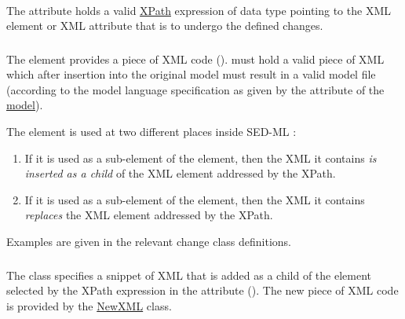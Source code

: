 

\paragraph*{}
\label{sec:changeTarget}
The  attribute holds  a valid \hyperref[sec:xpath]{XPath} expression of data type \hyperref[type:xpath]{} pointing to the XML element or XML attribute that is to undergo the defined changes.


\subsubsection{}
\label{sec:newXml}
The  element provides a piece of XML code ().  must hold a valid piece of XML  which after insertion into the original model must result in a valid model file (according to the model language specification as given by the \hyperref[sec:language]{} attribute of the \hyperref[class:model]{model}).

The  element is used at two different places inside SED-ML \currentLV:

\begin{enumerate}
	\item{If it is used as a sub-element of the \hyperref[class:addXml]{} element, then the XML it contains \emph{is inserted as a child} of the XML element addressed by the XPath.}
	\item{If it is used as a sub-element of the \hyperref[class:changeXml]{} element, then the XML it contains \emph{replaces} the XML element addressed by the XPath.}
\end{enumerate}

Examples are given in the relevant change class definitions.


\subsubsection{}
\label{class:addXml}
The  class specifies a snippet of XML that is added as a child of the element selected by the XPath expression in the \hyperref[sec:changeTarget]{} attribute (). The new piece of XML code is provided by the \hyperref[sec:newXml]{NewXML} class.


